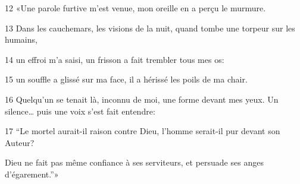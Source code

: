 
12 «Une parole furtive m’est venue, mon oreille en a perçu le murmure.

13 Dans les cauchemars, les visions de la nuit, quand tombe une torpeur sur les humains,

14 un effroi m’a saisi, un frisson a fait trembler tous mes os:

15 un souffle a glissé sur ma face, il a hérissé les poils de ma chair.

16 Quelqu’un se tenait là, inconnu de moi, une forme devant mes yeux. Un silence… puis une voix s’est fait entendre:

17 “Le mortel aurait-il raison contre Dieu, l’homme serait-il pur devant son Auteur?

Dieu ne fait pas même confiance à ses serviteurs, et persuade ses anges d’égarement.”»